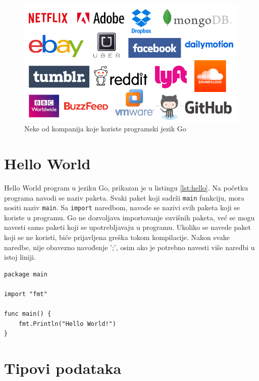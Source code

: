 \documentclass[12pt,oneside]{memoir}
\begin{document}
\begin{figure}
\begin{center}
\includegraphics[scale=2]{companies.png}
\end{center}
\caption{Neke od kompanija koje koriste programski jezik Go}
\label{fig:comp}
\end{figure}

\section{Hello World}
Hello World program u jeziku Go, prikazan je u listingu \ref{lst:hello}. Na početku programa navodi se naziv paketa. Svaki paket koji sadrži \texttt{main} funkciju, mora nositi naziv \texttt{main}. Sa \texttt{import} naredbom, navode se nazivi svih paketa koji se koriste u programu. Go ne dozvoljava importovanje suvišnih paketa, već se mogu navesti samo paketi koji se upotrebljavaju u programu. Ukoliko se navede paket koji se ne koristi, biće prijavljena greška tokom kompilacije. Nakon svake naredbe, nije obavezno navođenje ';', osim ako je potrebno navesti više naredbi u istoj liniji. 

\begin{center}
\begin{lstlisting}[caption=Hello World program u jeziku Go,label={lst:hello},  backgroundcolor=\color{background}]
package main

import "fmt"

func main() {
	fmt.Println("Hello World!")
}
\end{lstlisting}
\end{center}

\section{Tipovi podataka}
\end{document}
